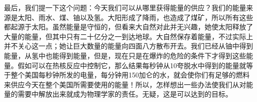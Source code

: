 最后，我们提一下这个问题：今天我们可以从哪里获得能量的供应？我们的能量来源是太阳、雨水、煤、铀以及氢。大阳形成了降雨，也造成了煤矿，所以所有这些都起源于太阳。虽然能量是守恒的，但看来大自然对此并无兴趣，她使太阳释放了大量的能量，但其中只有二十亿分之一到达地球。大自然保存着能量，不过实际上并不关心这一点；她让巨大数量的能量向四面八方散布开去。我们已经从铀中得到能量，从氢中也能得到能量，但是，现在只是在爆炸的危险的条件下才得到这些能量。假如可以在热核反应中控制它，那么结果每秒钟从10夸脱水中得到的能量就等于整个美国每秒钟所发的电量，每分钟用150加仑的水，就会使你们有足够的燃料来供应今天在整个美国所需要使用的能量！所以，怎样想出一些办法使我们从对能量的需要中解放出来就成为物理学家的责任。无疑，这是可以达到的目标。
